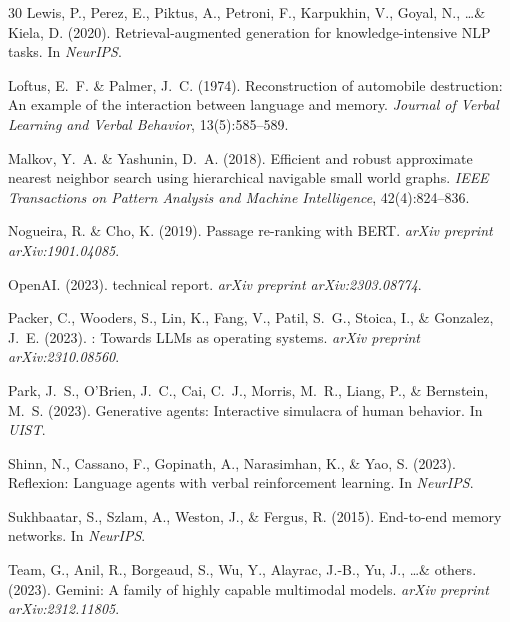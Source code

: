 \documentclass[11pt,a4paper]{article}
\begin{document}
\begin{thebibliography}{30}
Lewis, P., Perez, E., Piktus, A., Petroni, F., Karpukhin, V., Goyal, N., \ldots \& Kiela, D. (2020).
\newblock Retrieval-augmented generation for knowledge-intensive {NLP} tasks.
\newblock In \textit{NeurIPS}.

Loftus, E.~F. \& Palmer, J.~C. (1974).
\newblock Reconstruction of automobile destruction: An example of the interaction between language and memory.
\newblock \textit{Journal of Verbal Learning and Verbal Behavior}, 13(5):585--589.

Malkov, Y.~A. \& Yashunin, D.~A. (2018).
\newblock Efficient and robust approximate nearest neighbor search using hierarchical navigable small world graphs.
\newblock \textit{IEEE Transactions on Pattern Analysis and Machine Intelligence}, 42(4):824--836.

Nogueira, R. \& Cho, K. (2019).
\newblock Passage re-ranking with {BERT}.
\newblock \textit{arXiv preprint arXiv:1901.04085}.

OpenAI. (2023).
 technical report.
\newblock \textit{arXiv preprint arXiv:2303.08774}.

Packer, C., Wooders, S., Lin, K., Fang, V., Patil, S.~G., Stoica, I., \& Gonzalez, J.~E. (2023).
: Towards {LLMs} as operating systems.
\newblock \textit{arXiv preprint arXiv:2310.08560}.

Park, J.~S., O'Brien, J.~C., Cai, C.~J., Morris, M.~R., Liang, P., \& Bernstein, M.~S. (2023).
\newblock Generative agents: Interactive simulacra of human behavior.
\newblock In \textit{UIST}.

Shinn, N., Cassano, F., Gopinath, A., Narasimhan, K., \& Yao, S. (2023).
\newblock Reflexion: Language agents with verbal reinforcement learning.
\newblock In \textit{NeurIPS}.

Sukhbaatar, S., Szlam, A., Weston, J., \& Fergus, R. (2015).
\newblock End-to-end memory networks.
\newblock In \textit{NeurIPS}.

Team, G., Anil, R., Borgeaud, S., Wu, Y., Alayrac, J.-B., Yu, J., \ldots \& others. (2023).
\newblock Gemini: A family of highly capable multimodal models.
\newblock \textit{arXiv preprint arXiv:2312.11805}.


\end{thebibliography}
\end{document}
